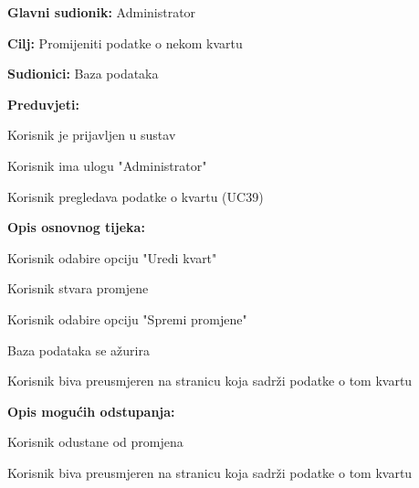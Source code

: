 					\noindent {}
					\begin{packed_item}
	
						\item \textbf{Glavni sudionik: }Administrator
						\item  \textbf{Cilj:} Promijeniti podatke o nekom kvartu
						\item  \textbf{Sudionici:} Baza podataka
						\item  \textbf{Preduvjeti:}
						\item[] \begin{packed_enum}
							\item Korisnik je prijavljen u sustav
							\item Korisnik ima ulogu "Administrator"
							\item Korisnik pregledava podatke o kvartu (UC39)
						\end{packed_enum}
						\item  \textbf{Opis osnovnog tijeka:}
						
						\item[] \begin{packed_enum}
	
							\item Korisnik odabire opciju "Uredi kvart"
							\item Korisnik stvara promjene
							\item Korisnik odabire opciju "Spremi promjene"
							\item Baza podataka se ažurira
							\item Korisnik biva preusmjeren na stranicu koja sadrži podatke o tom kvartu
						\end{packed_enum}
						
						\item  \textbf{Opis mogućih odstupanja:}
						
						\item[] \begin{packed_item}
	
							\item[3.a] Korisnik odustane od promjena
							\item[] \begin{packed_enum}
								
								\item Korisnik biva preusmjeren na stranicu koja sadrži podatke o tom kvartu
								
							\end{packed_enum}
							
						\end{packed_item}
					\end{packed_item}
					
